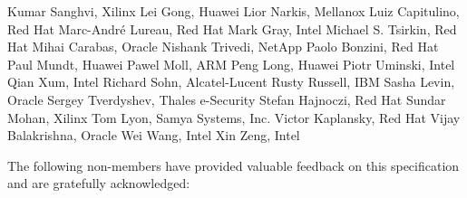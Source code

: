Kumar Sanghvi, Xilinx	\newline
Lei Gong,	Huawei	\newline
Lior Narkis,	Mellanox	\newline
Luiz Capitulino,	Red Hat	\newline
Marc-André Lureau, Red Hat	\newline
Mark Gray, Intel	\newline
Michael S. Tsirkin,	Red Hat	\newline
Mihai Carabas,	Oracle	\newline
Nishank Trivedi, NetApp	\newline
Paolo Bonzini,	Red Hat	\newline
Paul Mundt, Huawei	\newline
Pawel Moll,	ARM	\newline
Peng Long,	Huawei	\newline
Piotr Uminski, Intel	\newline
Qian Xum, Intel	\newline
Richard Sohn,	Alcatel-Lucent	\newline
Rusty Russell,	IBM	\newline
Sasha Levin,	Oracle	\newline
Sergey Tverdyshev,	Thales e-Security	\newline
Stefan Hajnoczi,	Red Hat	\newline
Sundar Mohan, Xilinx	\newline
Tom Lyon,	Samya Systems, Inc.	\newline
Victor Kaplansky, Red Hat	\newline
Vijay Balakrishna,	Oracle	\newline
Wei Wang, Intel	\newline
Xin Zeng, Intel	\newline

The following non-members have provided valuable feedback on this
specification and are gratefully acknowledged:

